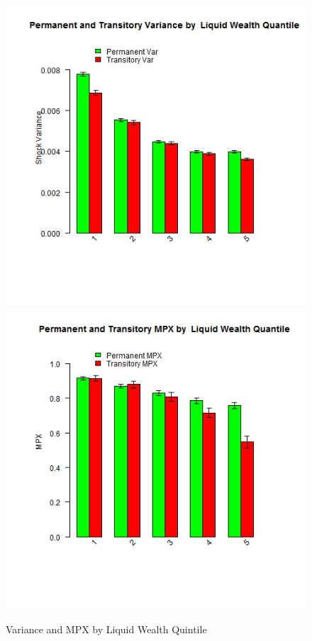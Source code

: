 \documentclass[titlepage]{\econtex}\newcommand{\texname}{IncomeUncertainty}
\begin{document}
\begin{figure}
	\centering
	\includegraphics[scale=0.45]{Figures/VarianceByLiquidWealth.png}
	\centering
	\includegraphics[scale=0.45]{Figures/MPXByLiquidWealth.png}
	\caption{Variance and MPX by Liquid Wealth Quintile}
	\label{fig:MPXByLiquidWealth}
\end{figure}
\end{document}
